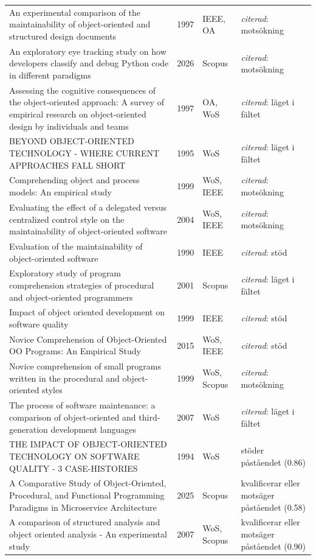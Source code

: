 \begin{longtable}{@{}%
  >{\raggedright\arraybackslash}p{}c%
  >{\raggedright\arraybackslash}p{}%
  >{\raggedright\arraybackslash}p{}@{}}
An experimental comparison of the maintainability of object-oriented and structured design documents & 1997 & IEEE, OA & \emph{citerad}: motsökning \\
An exploratory eye tracking study on how developers classify and debug Python code in different paradigms & 2026 & Scopus & \emph{citerad}: motsökning \\
Assessing the cognitive consequences of the object-oriented approach: A survey of empirical research on object-oriented design by individuals and teams & 1997 & OA, WoS & \emph{citerad}: läget i fältet \\
BEYOND OBJECT-ORIENTED TECHNOLOGY - WHERE CURRENT APPROACHES FALL SHORT & 1995 & WoS & \emph{citerad}: läget i fältet \\
Comprehending object and process models: An empirical study & 1999 & WoS, IEEE & \emph{citerad}: motsökning \\
Evaluating the effect of a delegated versus centralized control style on the maintainability of object-oriented software & 2004 & WoS, IEEE & \emph{citerad}: motsökning \\
Evaluation of the maintainability of object-oriented software & 1990 & IEEE & \emph{citerad}: stöd \\
Exploratory study of program comprehension strategies of procedural and object-oriented programmers & 2001 & Scopus & \emph{citerad}: läget i fältet \\
Impact of object oriented development on software quality & 1999 & IEEE & \emph{citerad}: stöd \\
Novice Comprehension of Object-Oriented OO Programs: An Empirical Study & 2015 & WoS, IEEE & \emph{citerad}: stöd \\
Novice comprehension of small programs written in the procedural and object-oriented styles & 1999 & WoS, Scopus & \emph{citerad}: motsökning \\
The process of software maintenance: a comparison of object-oriented and third-generation development languages & 2007 & WoS & \emph{citerad}: läget i fältet \\
THE IMPACT OF OBJECT-ORIENTED TECHNOLOGY ON SOFTWARE QUALITY - 3 CASE-HISTORIES & 1994 & WoS & stöder påståendet (0.86) \\
A Comparative Study of Object-Oriented, Procedural, and Functional Programming Paradigms in Microservice Architecture & 2025 & Scopus & kvalificerar eller motsäger påståendet (0.58) \\
A comparison of structured analysis and object oriented analysis - An experimental study & 2007 & WoS, Scopus & kvalificerar eller motsäger påståendet (0.90) \\

\end{longtable}
